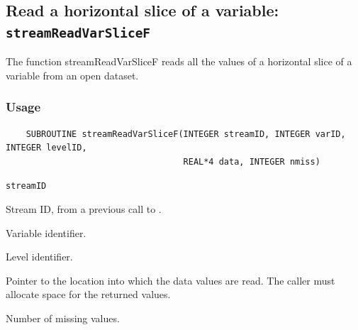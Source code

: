 \subsection{Read a horizontal slice of a variable: {\tt streamReadVarSliceF}}
\label{streamReadVarSliceF}

The function streamReadVarSliceF reads all the values of a horizontal slice of a variable
from an open dataset.
\subsubsection*{Usage}

\begin{verbatim}
    SUBROUTINE streamReadVarSliceF(INTEGER streamID, INTEGER varID, INTEGER levelID, 
                                   REAL*4 data, INTEGER nmiss)
\end{verbatim}

\hspace*{4mm}\begin{minipage}[]{15cm}
\begin{deflist}{\tt streamID\ }
\item[{\tt streamID}]
Stream ID, from a previous call to {}.
\item[{\tt varID}]
Variable identifier.
\item[{\tt levelID}]
Level identifier.
\item[{\tt data}]
Pointer to the location into which the data values are read.
                     The caller must allocate space for the returned values.
\item[{\tt nmiss}]
Number of missing values.

\end{deflist}
\end{minipage}
